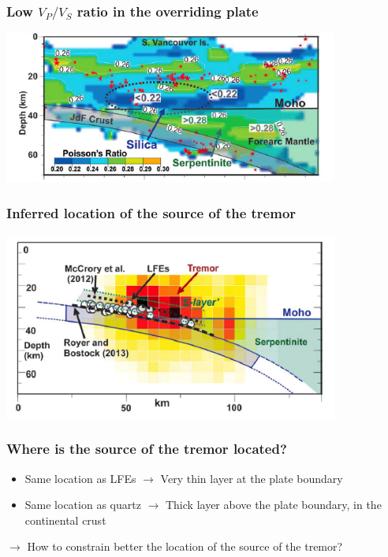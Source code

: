 \documentclass{beamer}
\begin{document}
	\begin{frame}
		\frametitle{Low $V_P / V_S$ ratio in the overriding plate}
		\begin{center}
			\includegraphics[trim={0cm 0cm 0cm 0cm}, clip, width=11cm]{articles/hyndmann_al_2015_8a.png}
		\end{center}
	\end{frame}

	\begin{frame}
		\frametitle{Inferred location of the source of the tremor}
		\begin{center}
			\includegraphics[trim={0cm 0cm 0cm 0cm}, clip, width=11cm]{articles/hyndmann_al_2015_8b.png}
		\end{center}
	\end{frame}

	\begin{frame}
		\frametitle{Where is the source of the tremor located?}
		\begin{itemize}
			\item Same location as LFEs $\rightarrow$ Very thin layer at the plate boundary
			\item Same location as quartz $\rightarrow$ Thick layer above the plate boundary, in the continental crust
		\end{itemize}

		\begin{block}{}
			$\rightarrow$ How to constrain better the location of the source of the tremor?
		\end{block}
	\end{frame}
\end{document}
